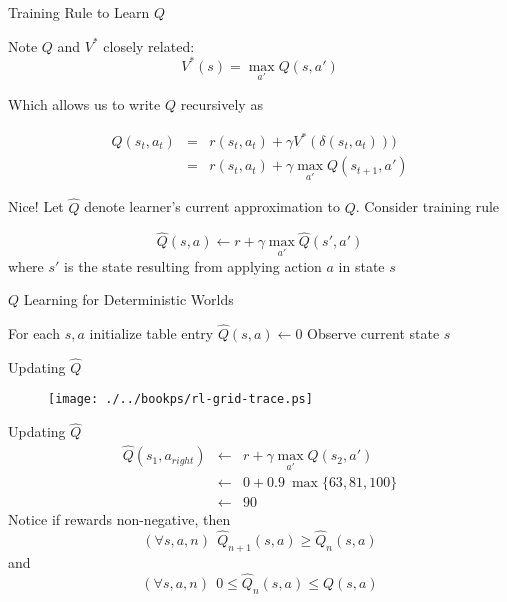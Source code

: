 \documentclass[%
pdf,
colorBG,
slideColor,
tcrico,
]{prosper}
\begin{document}
\begin{slide}{Training Rule to Learn $Q$ } 

Note $Q$ and $V^*$ closely related:
\[  V^{*}(s) = \max_{a'}Q(s,a') \]

Which allows us to write $Q$ recursively as

\begin{eqnarray}
Q(s_t,a_t) &= &  r(s_t,a_t) + \gamma V^{*}(\delta(s_t,a_t))) \nonumber \\
 &= &  r(s_t,a_t) + \gamma \max_{a'}Q(s_{t+1},a') \nonumber
\end{eqnarray}

Nice!  Let $\hat{Q}$ denote learner's current approximation to $Q$.  Consider
training rule

\[ \hat{Q}(s,a) \leftarrow r + \gamma \max_{a'}\hat{Q}(s',a') \]
\noindent
where $s'$ is the state resulting from applying action $a$ in state $s$
\end{slide}


\begin{slide}{$Q$ Learning for Deterministic Worlds } 


\begin{algorithm}[H]
 For each $s, a$ initialize table entry $\hat{Q}(s,a) \leftarrow 0$ \;
 Observe current state $s$ \;
\end{algorithm}

\end{slide}
\begin{slide}{Updating $\hat{Q}$ } 
	\begin{figure}
		\centering
		\texttt{[image: ./../bookps/rl-grid-trace.ps]}
	\end{figure}
\end{slide}
\begin{slide}{Updating $\hat{Q}$ } 
  \begin{eqnarray}
\hat{Q}(s_1,a_{right}) & \leftarrow & r + \gamma \max_{a'}\hat{Q}(s_2,a') \nonumber \\
 & \leftarrow & 0 + 0.9 \ \max \{63, 81, 100 \} \nonumber \\ & \leftarrow & 90
 \nonumber
\end{eqnarray}
Notice if rewards non-negative, then
\[(\forall s,a,n)\ \ \hat{Q}_{n+1}(s,a) \geq \hat{Q}_{n}(s,a) \]
and 
\[(\forall s,a,n)\ \  0 \leq \hat{Q}_n(s,a) \leq Q(s,a) \]
\end{slide}
\end{document}
